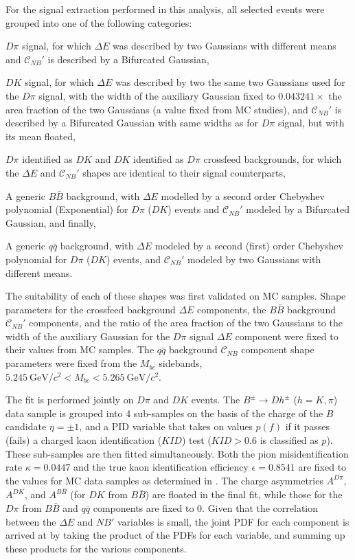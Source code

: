 \documentclass[aps,prl,twocolumn,superscriptaddress,showpacs,preprintnumbers,amsmath,amssymb]{revtex4}
\begin{document}
For the signal extraction performed in this analysis, all selected events were grouped into one of the following categories: 
\begin {enumerate*} [label=\itshape\arabic*\upshape)]
\item $D\pi$ signal, for which $\Delta E$ was described by two Gaussians with different means and $\mathcal{C}_{NB}'$ is described by a Bifurcated Gaussian, \item $DK$ signal, for which $\Delta E$ was described by two the same two Gaussians used for the $D\pi$ signal, with the width of the auxiliary Gaussian fixed to $0.043241 \times$ the area fraction of the two Gaussians (a value fixed from MC studies), and $\mathcal{C}_{NB}'$ is described by a Bifurcated Gaussian with same widths as for $D\pi$ signal, but with its mean floated, \item $D\pi$ identified as $DK$ and $DK$ identified as $D\pi$ crossfeed backgrounds, for which the $\Delta E$ and $\mathcal{C}_{NB}'$ shapes are identical to their signal counterparts, \item A generic $B\bar{B}$ background, with $\Delta E$ modelled by a second order Chebyshev polynomial (Exponential) for $D\pi$ ($DK$) events and $\mathcal{C}_{NB}'$ modeled by a Bifurcated Gaussian, and finally, \item A generic $q\bar{q}$ background, with $\Delta E$ modeled by a second (first) order Chebyshev polynomial for $D\pi$ ($DK$) events, and $\mathcal{C}_{NB}'$ modeled by two Gaussians with different means.
\end {enumerate*}

The suitability of each of these shapes was first validated on MC samples. Shape parameters for the crossfeed background $\Delta E$ components, the $B\bar{B}$ background $\mathcal{C}_{NB}'$ components, and the ratio of the area fraction of the two Gaussians to the width of the auxiliary Gaussian for the $D\pi$ signal $\Delta E$ component were fixed to their values from MC samples. The $q\bar{q}$ background $\mathcal{C}_{NB}$ component shape parameters were fixed from the $M_{bc}$ sidebands, $5.245 ~ \mathrm{GeV/}c^{2} < M_{bc} < 5.265 ~ \mathrm{GeV/}c^2$.

The fit is performed jointly on $D\pi$ and $DK$ events. The $B^{\pm} \rightarrow Dh^{\pm}$ ($h = K, \pi$) data sample is grouped into 4 sub-samples on the basis of the charge of the $B$ candidate $\eta = \pm 1$, and a PID variable that takes on values $p (f)$ if it passes (fails) a charged kaon identification ($KID$) test ($KID > 0.6$ is classified as $p$). These sub-samples are then fitted simultaneously. Both the pion misidentification rate $\kappa =  0.0447$ and the true kaon identification efficiency $\epsilon = 0.8541$ are fixed to the values for MC data samples as determined in \cite{BN1201}. The charge asymmetries $A^{D\pi}$, $A^{DK}$, and $A^{B\bar{B}}$ (for $DK$ from $B\bar{B}$) are floated in the final fit, while those for the $D\pi$ from $B\bar{B}$ and $q\bar{q}$ components are fixed to 0. Given that the correlation between the $\Delta E$ and $NB'$ variables is small, the joint PDF for each component is arrived at by taking the product of the PDFs for each variable, and summing up these products for the various components. 
\end{document}
